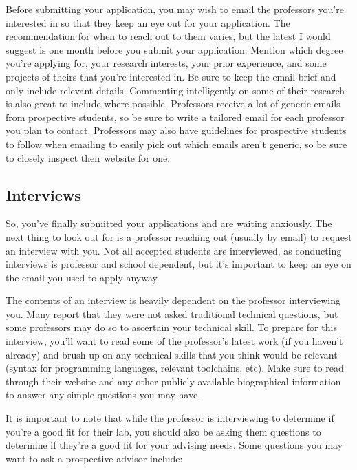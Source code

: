 \documentclass[12pt]{article}
\begin{document}
Before submitting your application, you may wish to email the professors you're interested in so that they keep an eye out for your application. The recommendation for when to reach out to them varies, but the latest I would suggest is one month before you submit your application. \cite{mightgradguide} Mention which degree you're applying for, your research interests, your prior experience, and some projects of theirs that you're interested in. Be sure to keep the email brief and only include relevant details. Commenting intelligently on some of their research is also great to include where possible. Professors receive a lot of generic emails from prospective students, so be sure to write a tailored email for each professor you plan to contact. Professors may also have guidelines for prospective students to follow when emailing to easily pick out which emails aren't generic, so be sure to closely inspect their website for one.

\subsection{Interviews}

So, you've finally submitted your applications and are waiting anxiously. The next thing to look out for is a professor reaching out (usually by email) to request an interview with you. Not all accepted students are interviewed, as conducting interviews is professor and school dependent, but it's important to keep an eye on the email you used to apply anyway.

The contents of an interview is heavily dependent on the professor interviewing you. Many report that they were not asked traditional technical questions, but some professors may do so to ascertain your technical skill. To prepare for this interview, you'll want to read some of the professor's latest work (if you haven't already) and brush up on any technical skills that you think would be relevant (syntax for programming languages, relevant toolchains, etc). Make sure to read through their website and any other publicly available biographical information to answer any simple questions you may have. 

It is important to note that while the professor is interviewing to determine if you're a good fit for their lab, you should also be asking them questions to determine if they’re a good fit for your advising needs. Some questions you may want to ask a prospective advisor include:
\end{document}

